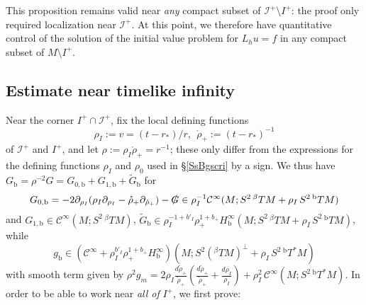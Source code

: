 \documentclass[reqno,11pt,letterpaper]{amsart}
\numberwithin{equation}{section}
\numberwithin{figure}{section}
\theoremstyle{definition}
\theoremstyle{remark}
\newcommand{\mc}{\mathcal}
\newcommand{\cC}{\mc C}
\newcommand{\ms}{\mathscr}
\newcommand{\scri}{\ms I}
\newcommand{\slG}{\slashed{G}{}}
\newcommand{\ringrho}{\mathring\rho}
\newcommand{\pa}{\partial}
\newcommand{\wt}{\widetilde}
\newcommand{\bop}{{\mathrm{b}}}
\newcommand{\Tb}{{}^{\bop}T}
\newcommand{\Tbeta}{{}^{\beta}T}
\newcommand{\CI}{\cC^\infty}
\newcommand{\Hb}{H_{\bop}}
\begin{document}
This proposition remains valid near \emph{any} compact subset of $\scri^+\setminus I^+$: the proof only required localization near $\scri^+$. At this point, we therefore have quantitative control of the solution of the initial value problem for $L_h u=f$ in any compact subset of $M\setminus I^+$.


\subsection{Estimate near timelike infinity}
\label{SsBgip}

Near the corner $I^+\cap\scri^+$, fix the local defining functions
\begin{equation}
\label{EqBgipNullDefFn}
  \rho_I := v = (t-r_*)/r,\ \ \ringrho_+:=(t-r_*)^{-1}
\end{equation}
of $\scri^+$ and $I^+$, and let $\rho:=\rho_I\ringrho_+=r^{-1}$; these only differ from the expressions for the defining functions $\rho_I$ and $\rho_0$ used in \S\ref{SsBgscri} by a sign. We thus have $G_\bop=\rho^{-2}G=G_{0,\bop}+G_{1,\bop}+\wt G_\bop$ for
\begin{equation}
\label{EqBgipDualMetric}
  G_{0,\bop} = -2\pa_{\rho_I}(\rho_I\pa_{\rho_I}-\ringrho_+\pa_{\ringrho_+})-\slG \in \rho_I^{-1}\CI(M;S^2\,\Tbeta M+\rho_I\,S^2\,\Tb M)
\end{equation}
and $G_{1,\bop}\in\CI(M;S^2\,\Tbeta M)$, $\wt G_\bop\in\rho_I^{-1+b'_I}\rho_+^{1+b_+}\Hb^\infty(M;S^2\,\Tbeta M+\rho_I\,S^2\,\Tb M)$, while
\[
  g_\bop \in (\CI+\rho_I^{b'_I}\rho_+^{1+b_+}\Hb^\infty)(M;S^2(\Tbeta M)^\perp + \rho_I\,S^2\,\Tb^*M)
\]
with smooth term given by $\rho^2 g_m=2\rho_I\tfrac{d\ringrho_+}{\ringrho_+}(\tfrac{d\ringrho_+}{\ringrho_+}+\tfrac{d\rho_I}{\rho_I})+\rho_I^2\,\CI(M;S^2\,\Tb^*M)$. In order to be able to work near \emph{all of} $I^+$, we first prove:
\end{document}
